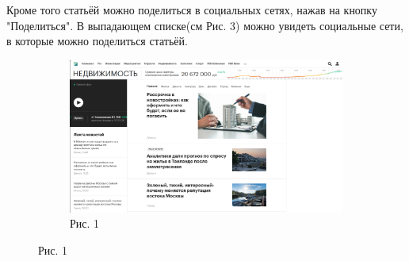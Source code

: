\documentclass{scrreprt}
\begin{document}
 Кроме того статьёй можно поделиться в социальных сетях, нажав на кнопку "Поделиться". В выпадающем списке(см Рис. 3) можно увидеть социальные сети, в которые можно поделиться статьёй.
 
 \begin{figure}
 	\centering
 	 \begin{subfigure}[b]{0.5\textwidth}
 		\includegraphics[width=\textwidth]{a}
 		\caption{Рис. 1} 
 	\end{subfigure}
 \end{figure}
 
\end{document}
